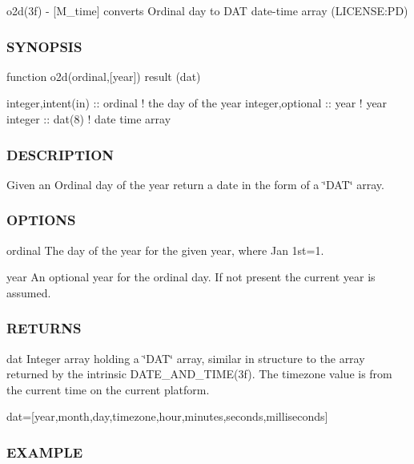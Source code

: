 o2d(3f) -\/ \mbox{[}M\+\_\+time\mbox{]} converts Ordinal day to D\+AT date-\/time array (L\+I\+C\+E\+N\+SE\+:PD) 

\subsubsection*{S\+Y\+N\+O\+P\+S\+IS}

\begin{DoxyVerb}function o2d(ordinal,[year]) result (dat)

 integer,intent(in) :: ordinal  ! the day of the year
 integer,optional   :: year     ! year
 integer            :: dat(8)   ! date time array
\end{DoxyVerb}


\subsubsection*{D\+E\+S\+C\+R\+I\+P\+T\+I\+ON}

Given an Ordinal day of the year return a date in the form of a \char`\"{}\+D\+A\+T\char`\"{} array.

\subsubsection*{O\+P\+T\+I\+O\+NS}

ordinal The day of the year for the given year, where Jan 1st=1.

year An optional year for the ordinal day. If not present the current year is assumed.

\subsubsection*{R\+E\+T\+U\+R\+NS}

dat Integer array holding a \char`\"{}\+D\+A\+T\char`\"{} array, similar in structure to the array returned by the intrinsic D\+A\+T\+E\+\_\+\+A\+N\+D\+\_\+\+T\+I\+M\+E(3f). The timezone value is from the current time on the current platform.

dat=\mbox{[}year,month,day,timezone,hour,minutes,seconds,milliseconds\mbox{]}

\subsubsection*{E\+X\+A\+M\+P\+LE}

